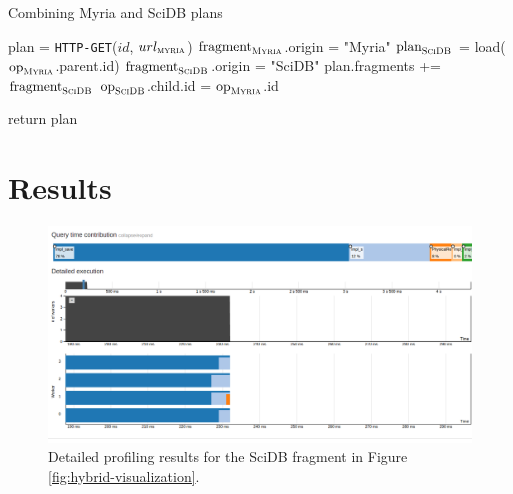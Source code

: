 \documentclass{chi2009}
\begin{document}
\begin{algorithm}
\caption{Combining Myria and SciDB plans}\label{alg:create-hybrid-plan}
\begin{algorithmic}[1]
\State plan = \texttt{HTTP-GET}($id$, $url_{\textsc{myria}}$)
  \State $\text{fragment}_{\textsc{Myria}}$.origin = "Myria"
      \State $\text{plan}_{\textsc{SciDB}}$ = load($\text{op}_{\textsc{Myria}}$.parent.id)
		\State $\text{fragment}_{\textsc{SciDB}}$.origin = "SciDB"
        \State plan.fragments += $\text{fragment}_{\textsc{SciDB}}$
          	\State $\text{op}_{\textsc{SciDB}}$.child.id = $\text{op}_{\textsc{Myria}}$.id
          \EndIf
        \EndFor
	  \EndFor
    \EndIf
  \EndFor
\EndFor

\State return plan

\end{algorithmic}
\end{algorithm}

\section{Results}


\begin{figure}
\centering
\includegraphics[width=\textwidth]{visualization-detail.png}
\caption{Detailed profiling results for the SciDB fragment in Figure \ref{fig:hybrid-visualization}.}
\label{fig:scidb-detail}
\end{figure}
\end{document}
